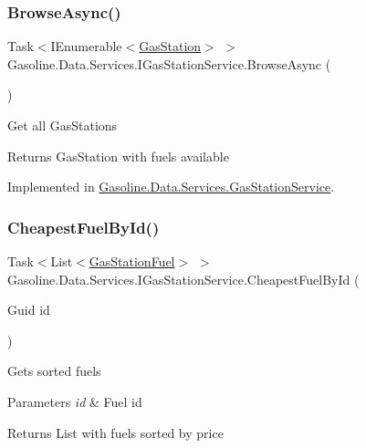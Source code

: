 \subsubsection{\texorpdfstring{BrowseAsync()}{BrowseAsync()}}
{\footnotesize\ttfamily Task$<$I\+Enumerable$<$\mbox{\hyperlink{class_gasoline_1_1_data_1_1_models_1_1_gas_station}{Gas\+Station}}$>$ $>$ Gasoline.\+Data.\+Services.\+I\+Gas\+Station\+Service.\+Browse\+Async (\begin{DoxyParamCaption}{ }\end{DoxyParamCaption})}



Get all Gas\+Stations 

\begin{DoxyReturn}{Returns}
Gas\+Station with fuels available
\end{DoxyReturn}


Implemented in \mbox{\hyperlink{class_gasoline_1_1_data_1_1_services_1_1_gas_station_service_adb5cc988c7237c4019008a3c86bbe25f}{Gasoline.\+Data.\+Services.\+Gas\+Station\+Service}}.

\mbox{\label{interface_gasoline_1_1_data_1_1_services_1_1_i_gas_station_service_ab8df09742ef4c7f1935743ca59b71824}} 
\subsubsection{\texorpdfstring{CheapestFuelById()}{CheapestFuelById()}}
{\footnotesize\ttfamily Task$<$List$<$\mbox{\hyperlink{class_gasoline_1_1_data_1_1_models_1_1_gas_station_fuel}{Gas\+Station\+Fuel}}$>$ $>$ Gasoline.\+Data.\+Services.\+I\+Gas\+Station\+Service.\+Cheapest\+Fuel\+By\+Id (\begin{DoxyParamCaption}\item[{Guid}]{id }\end{DoxyParamCaption})}



Gets sorted fuels 


\begin{DoxyParams}{Parameters}
{\em id} & Fuel id\\
\hline
\end{DoxyParams}
\begin{DoxyReturn}{Returns}
List with fuels sorted by price
\end{DoxyReturn}


